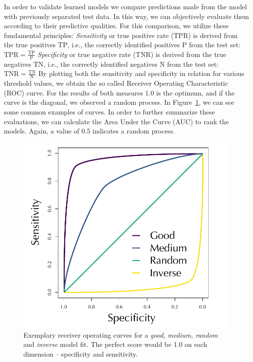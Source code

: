 \documentclass[conference]{IEEEtran}
\begin{document}
In order to validate learned models we compare predictions made from the model with previously separated test data. In this way, we can objectively evaluate them according to their predictive qualities. For this comparison, we utilize these fundamental principles:
\newline \textit{Sensitivity} or true positive rate ($\mathrm{TPR}$) is derived from the true positives $\mathrm{TP}$,  i.e., the correctly identified positives $\mathrm{P}$ from the test set: 
$
\mathrm{TPR}=\frac{\mathrm{TP}}{\mathrm{P}}
$
\newline \textit{Specificity} or true negative rate ($\mathrm{TNR}$) is derived from the true negatives $\mathrm{TN}$,  i.e., the correctly identified negatives $\mathrm{N}$ from the test set: 
$
\mathrm{TNR}=\frac{\mathrm{TN}}{\mathrm{N}}
$
\newline By plotting both the sensitivity and specificity in relation for various threshold values, we obtain the so called Receiver Operating Characteristic (ROC) curve. For the results of both measures 1.0 is the optimum, and if the curve is the diagonal, we observed a random process.  In Figure~\ref{fig:exroc}, we can see some common examples of curves. In order to further summarize these evaluations, we can calculate the Area Under the Curve (AUC) to rank the models. Again, a value of 0.5 indicates a random process.  \cite{Hastie2009}  \cite{Kauermann2021}  \cite{Russell2021} 

\begin{figure}[h!]
\centering
\includegraphics[width=.85\linewidth]{pictures/ROC.pdf}
\caption[ROC explanation]{Exemplary receiver operating curves for  a \textit{good, medium, random} and \textit{inverse} model fit. The perfect score would be 1.0 on each dimension -- specificity and sensitivity.}
\label{fig:exroc}
\end{figure}
\end{document}

